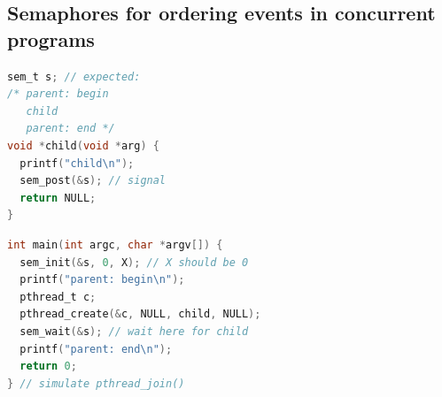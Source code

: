 \documentclass[8pt,a4paper,landscape]{extarticle}
\begin{document}
\begin{multicols*}{3}
\section*{Semaphores for ordering events in concurrent programs}
\begin{minipage}{.4\linewidth}
\begin{lstlisting}[language=c,xleftmargin=2pt,xrightmargin=2pt]
sem_t s; // expected:
/* parent: begin
   child
   parent: end */
void *child(void *arg) {
  printf("child\n");
  sem_post(&s); // signal
  return NULL;
}
\end{lstlisting}
\end{minipage}
\begin{minipage}{.6\linewidth}
\begin{lstlisting}[language=c,xleftmargin=2pt,xrightmargin=2pt]
int main(int argc, char *argv[]) {
  sem_init(&s, 0, X); // X should be 0
  printf("parent: begin\n");
  pthread_t c;
  pthread_create(&c, NULL, child, NULL);
  sem_wait(&s); // wait here for child
  printf("parent: end\n");
  return 0;
} // simulate pthread_join()
\end{lstlisting}
\end{minipage}


\end{multicols*}
\end{document}
